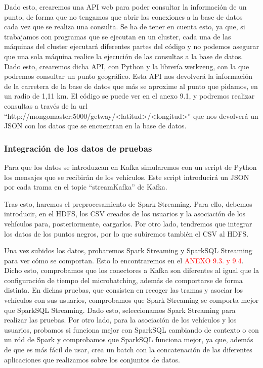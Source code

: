 Dado esto, crearemos una API web para poder consultar la información de un punto, de forma que no tengamos que abrir las conexiones a la base de datos cada vez que se realiza una consulta. Se ha de tener en cuenta esto, ya que, si trabajamos con programas que se ejecutan en un cluster, cada una de las máquinas del cluster ejecutará diferentes partes del código y no podemos asegurar que una sola máquina realice la ejecución de las consultas a la base de datos. Dado esto, crearemos dicha API, con Python y la librería werkzeug, con la que podremos consultar un punto geográfico. Esta API nos devolverá la información de la carretera de la base de datos que más se aproxime al punto que pidamos, en un radio de 1,11 km. El código se puede ver en el anexo 9.1, y podremos realizar consultas a través de la url “http://mongomaster:5000/getway/<latitud>/<longitud>” que nos devolverá un JSON con los datos que se encuentran en la base de datos.\par

\subsubsection {Integración de los datos de pruebas \label{integracion}}    
     
Para que los datos se introduzcan en Kafka simularemos con un script de Python los mensajes que se recibirán de los vehículos. Este script introducirá un JSON por cada trama en el topic “streamKafka” de Kafka.\par

Tras esto, haremos el preprocesamiento de Spark Streaming. Para ello, debemos introducir, en el HDFS, los CSV creados de los usuarios y la asociación de los vehículos para, posteriormente, cargarlos. Por otro lado, tendremos que integrar los datos de los puntos negros, por lo que subiremos también el CSV al HDFS.\par

Una vez subidos los datos, probaremos Spark Streaming y SparkSQL Streaming para ver cómo se comportan. Esto lo encontraremos en el \textcolor{red}{ANEXO 9.3. y 9.4}. Dicho esto, comprobamos que los conectores a Kafka son diferentes al igual que la configuración de tiempo del microbatching, además de comportarse de forma distinta. En dichas pruebas, que consisten en recoger las tramas y asociar los vehículos con sus usuarios, comprobamos que Spark Streaming se comporta mejor que SparkSQL Streaming. Dado esto, seleccionamos Spark Streaming para realizar las pruebas. Por otro lado, para la asociación de los vehículos y los usuarios, probamos si funciona mejor con SparkSQL cambiando de contexto o con un rdd de Spark y comprobamos que SparkSQL funciona mejor, ya que, además de que es más fácil de usar, crea un batch con la concatenación de las diferentes aplicaciones que realizamos sobre los conjuntos de datos.\par

